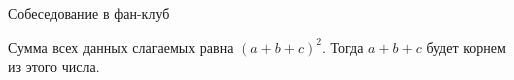 \begin{tutorial}{Собеседование в фан-клуб\label{fanclubtutorial}}

Сумма всех данных слагаемых равна $(a + b + c)^2$. Тогда $a + b + c$ будет корнем из этого числа.

\end{tutorial}
